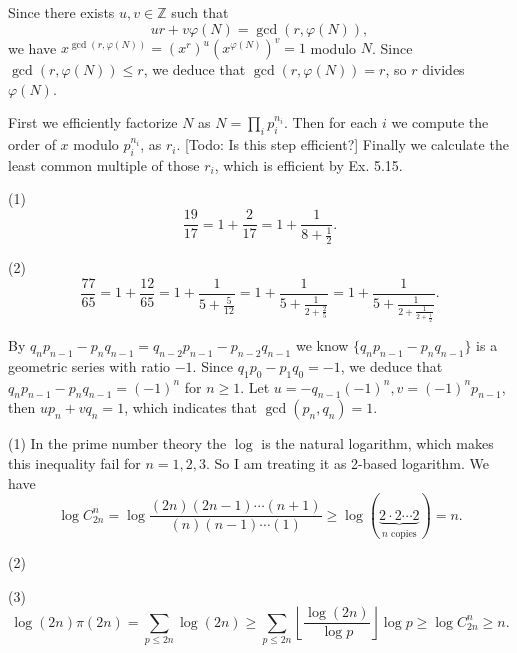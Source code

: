 \ex Since there exists $u,v\in\mathbb{Z}$ such that 
$$
ur+v\varphi(N)=\gcd(r,\varphi(N)),
$$
we have $x^{\gcd(r,\varphi(N))}=(x^r)^u(x^{\varphi(N)})^v=1$ modulo $N$.
Since $\gcd(r,\varphi(N))\le r$, we deduce that $\gcd(r,\varphi(N))=r$, so $r$ divides $\varphi(N)$.

\ex First we efficiently factorize $N$ as $N=\prod_ip_i^{n_i}$.
Then for each $i$ we compute the order of $x$ modulo $p_i^{n_i}$, as $r_i$.
{\color{red}[Todo: Is this step efficient?]}
Finally we calculate the least common multiple of those $r_i$, which is efficient by Ex. 5.15.

\ex (1) $$\frac{19}{17}=1+\frac{2}{17}=1+\frac{1}{8+\frac{1}{2}}.$$

(2) $$\frac{77}{65}=1+\frac{12}{65}=1+\frac{1}{5+\frac{5}{12}}=1+\frac{1}{5+\frac{1}{2+\frac{2}{5}}}=1+\frac{1}{5+\frac{1}{2+\frac{1}{2+\frac{1}{2}}}}.$$

\ex By $q_np_{n-1}-p_nq_{n-1} = q_{n-2}p_{n-1}-p_{n-2}q_{n-1}$ we know $\{q_np_{n-1}-p_nq_{n-1}\}$ is a geometric series with ratio $-1$.
Since $q_1p_0-p_1q_0=-1$, we deduce that $q_np_{n-1}-p_nq_{n-1}=(-1)^n$ for $n\ge 1$.
Let $u=-q_{n-1}(-1)^n, v=(-1)^np_{n-1}$, then $up_n+vq_n=1$, which indicates that $\gcd(p_n,q_n)=1$.

\prob (1) In the prime number theory the $\log$ is the natural logarithm, which makes this inequality fail for $n=1,2,3$.
So I am treating it as 2-based logarithm.
We have
$$
    \log C_{2n}^n = \log\frac{(2n)(2n-1)\cdots(n+1)}{(n)(n-1)\cdots(1)}
    \ge \log(\underbrace{2\cdot2\cdots2}_{n\text{ copies}}) = n.
$$

(2) \todo

(3) $$\log(2n)\pi(2n) = \sum_{p\le 2n}\log(2n) \ge \sum_{p\le 2n} \left\lfloor \frac{\log(2n)}{\log p} \right\rfloor \log p \ge \log C_{2n}^n \ge n.$$
